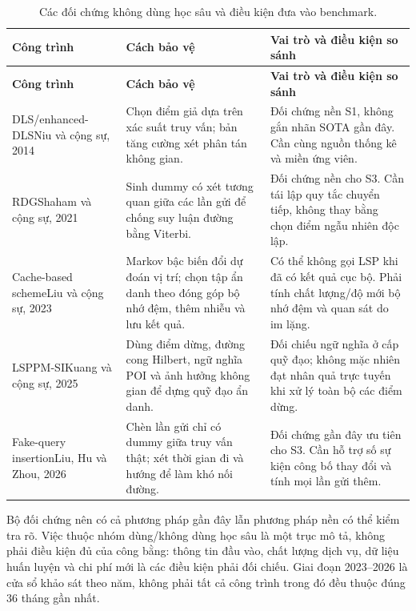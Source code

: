 \documentclass[12pt,a4paper,oneside]{report}
\begin{document}
\begingroup\small{}
\begin{longtable}{P{3.0cm}P{5.2cm}P{6.15cm}}
\caption{Các đối chứng không dùng học sâu và điều kiện đưa vào benchmark.}
\label{tab:non-neural}\\
\toprule
\textbf{Công trình} & \textbf{Cách bảo vệ} & \textbf{Vai trò và điều kiện so sánh}\\
\midrule\endfirsthead
\toprule\textbf{Công trình} & \textbf{Cách bảo vệ} & \textbf{Vai trò và điều kiện so sánh}\\
\midrule\endhead\bottomrule\endfoot
DLS/enhanced-DLS\newline Niu và cộng sự, 2014~\citep{niu2014dls}
& Chọn điểm giả dựa trên xác suất truy vấn; bản tăng cường xét phân tán không gian.
& Đối chứng nền S1, không gắn nhãn SOTA gần đây. Cần cùng nguồn thống kê và miền ứng viên.\\
\midrule
RDG\newline Shaham và cộng sự, 2021~\citep{shaham2021viterbi}
& Sinh dummy có xét tương quan giữa các lần gửi để chống suy luận đường bằng Viterbi.
& Đối chứng nền cho S3. Cần tái lập quy tắc chuyển tiếp, không thay bằng chọn điểm ngẫu nhiên độc lập.\\
\midrule
Cache-based scheme\newline Liu và cộng sự, 2023~\citep{liu2023cache}
& Markov bậc biến đổi dự đoán vị trí; chọn tập ẩn danh theo đóng góp bộ nhớ đệm, thêm nhiễu và lưu kết quả.
& Có thể không gọi LSP khi đã có kết quả cục bộ. Phải tính chất lượng/độ mới bộ nhớ đệm và quan sát do im lặng.\\
\midrule
LSPPM-SI\newline Kuang và cộng sự, 2025~\citep{kuang2025lsppm}
& Dùng điểm dừng, đường cong Hilbert, ngữ nghĩa POI và ảnh hưởng không gian để dựng quỹ đạo ẩn danh.
& Đối chiếu ngữ nghĩa ở cấp quỹ đạo; không mặc nhiên đạt nhân quả trực tuyến khi xử lý toàn bộ các điểm dừng.\\
\midrule
Fake-query insertion\newline Liu, Hu và Zhou, 2026~\citep{liu2026fakequeries}
& Chèn lần gửi chỉ có dummy giữa truy vấn thật; xét thời gian đi và hướng để làm khó nối đường.
& Đối chứng gần đây ưu tiên cho S3. Cần hỗ trợ số sự kiện công bố thay đổi và tính mọi lần gửi thêm.\\
\end{longtable}
\endgroup

Bộ đối chứng nên có cả phương pháp gần đây lẫn phương pháp nền có thể kiểm tra rõ. Việc thuộc nhóm dùng/không dùng học sâu là một trục mô tả, không phải điều kiện đủ của công bằng: thông tin đầu vào, chất lượng dịch vụ, dữ liệu huấn luyện và chi phí mới là các điều kiện phải đối chiếu. Giai đoạn 2023--2026 là cửa sổ khảo sát theo năm, không phải tất cả công trình trong đó đều thuộc đúng 36 tháng gần nhất.
\end{document}
